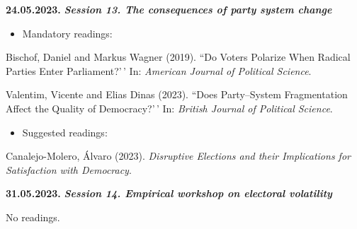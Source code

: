 \documentclass[
  12pt,
]{article}
\providecommand{\tightlist}{%
  \setlength{\itemsep}{0pt}\setlength{\parskip}{0pt}}
\begin{document}
\textbf{24.05.2023.} \textbf{\emph{Session 13. The consequences of party
system change}}

\begin{itemize}
\tightlist
\item
  Mandatory readings:
\end{itemize}

Bischof, Daniel and Markus Wagner (2019). ``Do Voters Polarize When
Radical Parties Enter Parliament?'\,' In:
\emph{American Journal of Political Science}.

Valentim, Vicente and Elias Dinas (2023). ``Does Party--System
Fragmentation Affect the Quality of Democracy?'\,' In:
\emph{British Journal of Political Science}.

\begin{itemize}
\tightlist
\item
  Suggested readings:
\end{itemize}

Canalejo-Molero, Álvaro (2023).
\emph{Disruptive Elections and their Implications for Satisfaction with Democracy}.

\textbf{31.05.2023.} \textbf{\emph{Session 14. Empirical workshop on
electoral volatility}}

No readings.
\end{document}
